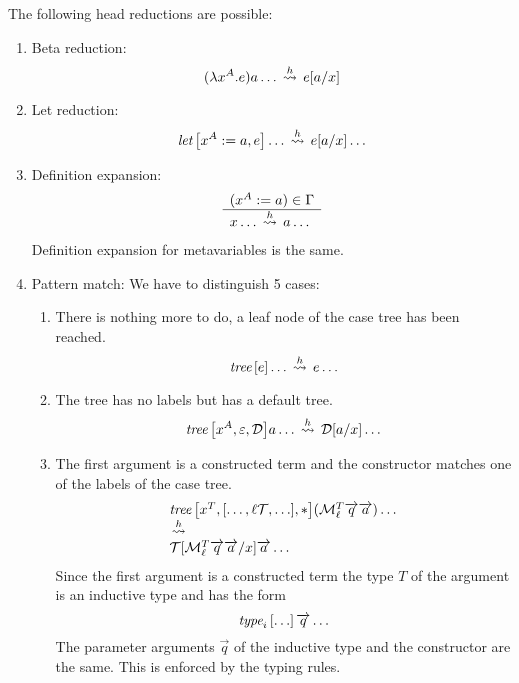 The following head reductions are possible:
\begin{enumerate}
    \item Beta reduction:
        $$
        (\lambda x^A . e) a \ldots
        \,\stackrel{h}{\leadsto}\,
        e[a/x]
        $$



    \item Let reduction:
        $$
            {\text{\it let}}\left[ {x^A := a, e} \right] \ldots
            \,\stackrel{h}{\leadsto}\,
            e[a/x] \ldots
        $$



    \item Definition expansion:
        $$
        \begin{array}{l} 
            (x^A := a) \in \Gamma
         \\ \hline 
            x \ldots \,\stackrel{h}{\leadsto}\, a \ldots
         \end{array}
        $$
        Definition expansion for metavariables is the same.



    \item Pattern match:
        We have to distinguish 5 cases:
        \begin{enumerate}
            \item There is nothing more to do, a leaf node of the case tree has
                been reached.
                $$
                    {{\text{\it tree}} \left[ {e} \right]} \ldots
                    \,\stackrel{h}{\leadsto}\,
                    e \ldots
                $$

            \item The tree has no labels but has a default tree.
                $$
                    {{\text{\it tree}} \left[ {x^A, \varepsilon, {\mathcal D}} \right]} a \ldots
                    \,\stackrel{h}{\leadsto}\,
                    {\mathcal D}[a/x] \ldots
                $$

            \item The first argument is a constructed term and the constructor
                matches one of the labels of the case tree.
                $$
                \begin{array}{lllll} 
                    {{\text{\it tree}}\left[ {x^T, [\ldots, \ell {\mathcal T}, \ldots], *} \right]}
                        ({\cal M}^T_\ell {\overrightarrow {q}} {\overrightarrow {a}})
                        \ldots
                    \\ \,\stackrel{h}{\leadsto}\, \\
                    {\mathcal T}[{\cal M}^T_\ell {\overrightarrow {q}} {\overrightarrow {a}} / x]
                        {\overrightarrow {a}}
                        \ldots
                 \end{array}
                $$
                Since the first argument is a constructed term the type $T$ of
                the argument is an inductive type and has the form
                $$
                {\text{\it type}}_i \left[ {\ldots} \right] {\overrightarrow {q}} \ldots
                $$
                The parameter arguments
                $\vec q$ of the inductive type and the constructor are the same.
                This is enforced by the typing rules.


\end{enumerate}
\end{enumerate}
